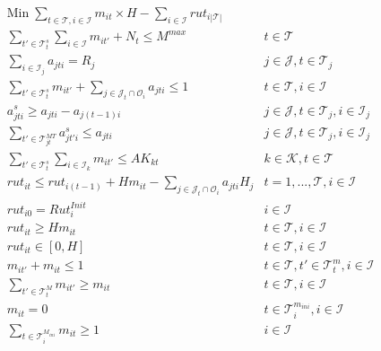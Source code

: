 \documentclass{roadef}
\begin{document}
\begin{align}
	& \text{Min}\; \sum_{t \in \mathcal{T}, i \in \mathcal{I}} m_{it} \times H - \sum_{i \in \mathcal{I}} rut_{i|\mathcal{T}|} \\
    & \sum_{t' \in \mathcal{T}^{s}_t} \sum_{i \in \mathcal{I}} m_{it'} + N_t \leq M^{max}
      & t \in \mathcal{T} \label{eq:capacity1}\\
    & \sum_{i \in \mathcal{I}_j} a_{jti} = R_j
            & j \in \mathcal{J}, t \in \mathcal{T}_j  \label{eq:taskres}\\
    & \sum_{t' \in \mathcal{T}^{s}_t} m_{it'} + \sum_{j \in \mathcal{J}_t \cap \mathcal{O}_i} a_{jti} \leq 1 
            & t \in \mathcal{T}, i \in \mathcal{I} \label{eq:state}\\
    & a^s_{jti} \geq a_{jti} - a_{j(t-1)i}
            & j \in \mathcal{J}, t \in \mathcal{T}_j, i \in \mathcal{I}_j \label{eq:start1} \\
    & \sum_{t' \in \mathcal{T}^{MT}_{jt}} a^s_{jt'i} \leq a_{jti} 
    & j \in \mathcal{J}, t \in \mathcal{T}_j, i \in \mathcal{I}_j \label{eq:start3}\\
   & \sum_{t' \in \mathcal{T}^{s}_t} \sum_{i \in \mathcal{I}_k} m_{it'} \leq AK_{kt}
    &k \in \mathcal{K}, t \in \mathcal{T} \label{eq:avalaibility-cluster} \\
     & rut_{it} \leq rut_{i(t-1)} + H m_{it} - \sum_{j \in \mathcal{J}_t \cap \mathcal{O}_i} a_{jti} H_j 
     	& t =1, ..., \mathcal{T}, i \in \mathcal{I} \\
    & rut_{i0} = Rut^{Init}_i
           & i \in \mathcal{I} \\
    & rut_{it} \geq H m_{it}
            & t \in \mathcal{T}, i \in \mathcal{I}\\ 
    & rut_{it} \in [0,H]
            & t \in \mathcal{T}, i \in \mathcal{I} \\
    & m_{it'} + m_{it} \leq 1
      & t \in \mathcal{T}, t' \in \mathcal{T}^{m}_t, i \in \mathcal{I}\label{eq:ret_min}\\ 
    & \sum_{t' \in \mathcal{T}^{M}_t} m_{it'} \geq  m_{it}
      & t \in \mathcal{T}, i \in \mathcal{I}\label{eq:ret_max}\\
    & m_{it} = 0
      & t \in \mathcal{T}^{m_{ini}}_i, i \in \mathcal{I} \\
    & \sum_{t \in \mathcal{T}^{M_{ini}}_i} m_{it} \geq  1 
      & i \in \mathcal{I}
\end{align}




\end{document}
